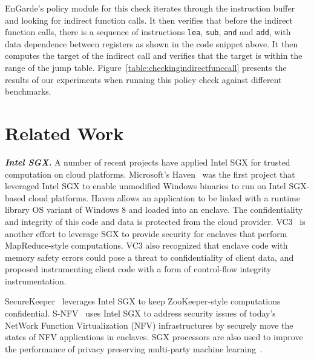\documentclass[conference,compsoc]{IEEEtran}
\newcommand{\figref}[1]{Figure~\ref{#1}}
\newcommand{\myparagraphsquish}[1]{\noindent\textbf{\textit{#1}}}
\newcommand{\code}[1]{{\tt \footnotesize #1}}
\newcommand{\tool}{EnGarde\xspace} %
\begin{document}
\tool's policy module for this check iterates through the instruction buffer
and looking for indirect function calls. It then verifies that before the
indirect function calls, there is a sequence of instructions \code{lea},
\code{sub}, \code{and} and \code{add}, with data dependence between registers
as shown in the code snippet above. It then computes the target of the indirect
call and verifies that the target is within the range of the jump table.
\figref{table:checkingindirectfunccall} presents the results of our experiments
when running this policy check against different benchmarks.


% 

\section{Related Work}
\label{section:related}

\myparagraphsquish{Intel SGX.} A number of recent projects have applied Intel
SGX for trusted computation on cloud platforms. Microsoft's
Haven~\citep{haven:tocs15} was the first project that leveraged Intel SGX to
enable unmodified Windows binaries to run on Intel SGX-based cloud platforms.
Haven allows an application to be linked with a runtime library OS variant of
Windows 8 and loaded into an enclave. The confidentiality and integrity of this
code and data is protected from the cloud provider.  VC3~\cite{vc3:oak15} is
another effort to leverage SGX to provide security for enclaves that perform
MapReduce-style computations.  VC3 also recognized that enclave code with
memory safety errors could pose a threat to confidentiality of client data, and
proposed instrumenting client code with a form of control-flow integrity
instrumentation. 

SecureKeeper~\cite{securekeeper:middleware16} leverages Intel SGX to keep
ZooKeeper-style computations confidential. S-NFV~\cite{snfv:sdn16} uses Intel
SGX to address security issues of today's NetWork Function Virtualization (NFV)
infrastructures by securely move the states of NFV applications in enclaves. SGX
processors are also used to improve the performance of privacy preserving
multi-party machine learning~\cite{machinelearningsgx:usenixsec16}.  
\end{document}
